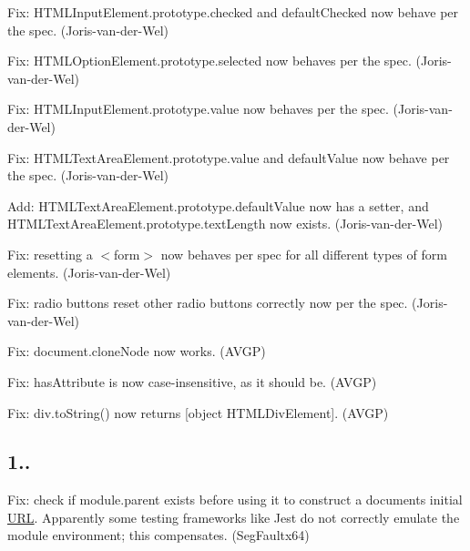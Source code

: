 \begin{DoxyItemize}
\item Fix\+: {\ttfamily H\+T\+M\+L\+Input\+Element.\+prototype.\+checked} and {\ttfamily default\+Checked} now behave per the spec. (Joris-\/van-\/der-\/\+Wel)
\item Fix\+: {\ttfamily H\+T\+M\+L\+Option\+Element.\+prototype.\+selected} now behaves per the spec. (Joris-\/van-\/der-\/\+Wel)
\item Fix\+: {\ttfamily H\+T\+M\+L\+Input\+Element.\+prototype.\+value} now behaves per the spec. (Joris-\/van-\/der-\/\+Wel)
\item Fix\+: {\ttfamily H\+T\+M\+L\+Text\+Area\+Element.\+prototype.\+value} and {\ttfamily default\+Value} now behave per the spec. (Joris-\/van-\/der-\/\+Wel)
\item Add\+: {\ttfamily H\+T\+M\+L\+Text\+Area\+Element.\+prototype.\+default\+Value} now has a setter, and {\ttfamily H\+T\+M\+L\+Text\+Area\+Element.\+prototype.\+text\+Length} now exists. (Joris-\/van-\/der-\/\+Wel)
\item Fix\+: resetting a {\ttfamily $<$form$>$} now behaves per spec for all different types of form elements. (Joris-\/van-\/der-\/\+Wel)
\item Fix\+: radio buttons reset other radio buttons correctly now per the spec. (Joris-\/van-\/der-\/\+Wel)
\item Fix\+: {\ttfamily document.\+clone\+Node} now works. (A\+V\+GP)
\item Fix\+: {\ttfamily has\+Attribute} is now case-\/insensitive, as it should be. (A\+V\+GP)
\item Fix\+: {\ttfamily div.\+to\+String()} now returns {\ttfamily \mbox{[}object H\+T\+M\+L\+Div\+Element\mbox{]}}. (A\+V\+GP)
\end{DoxyItemize}

\subsection*{1..}


\begin{DoxyItemize}
\item Fix\+: check if {\ttfamily module.\+parent} exists before using it to construct a document\textquotesingle{}s initial \mbox{\hyperlink{namespace_u_r_l}{U\+RL}}. Apparently some testing frameworks like Jest do not correctly emulate the module environment; this compensates. (Seg\+Faultx64)
\end{DoxyItemize}

